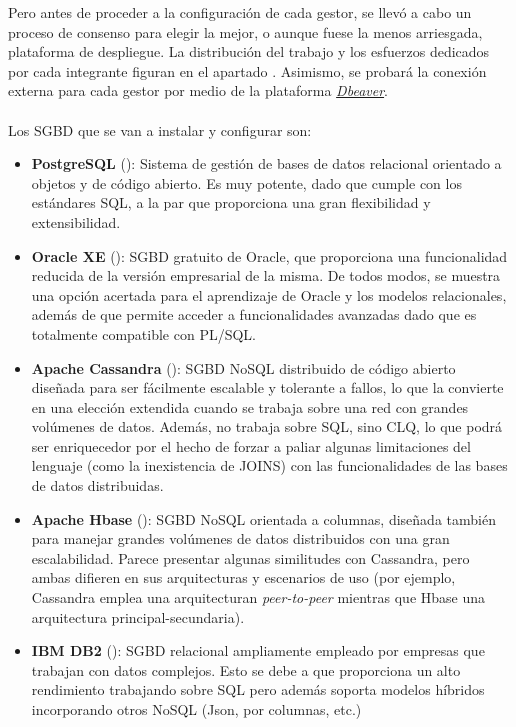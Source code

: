\documentclass{article}
\begin{document}
Pero antes de proceder a la configuración de cada gestor, se llevó a cabo un proceso de consenso para elegir la mejor, o aunque fuese la menos arriesgada, plataforma de despliegue. La distribución del trabajo y los esfuerzos dedicados por cada integrante figuran en el apartado \textcolor{blue}{}. Asimismo, se probará la conexión externa para cada gestor por medio de la plataforma \textit{\textcolor{blue}{\href{https://dbeaver.com/download/enterprise/}{Dbeaver}}}.
\\ \\
Los SGBD que se van a instalar y configurar son:
\begin{itemize}
    \item \textbf{PostgreSQL} (): Sistema de gestión de bases de datos relacional orientado a objetos y de código abierto. Es muy potente, dado que cumple con los estándares SQL, a la par que proporciona una gran flexibilidad y extensibilidad.
    \item \textbf{Oracle XE} (): SGBD gratuito de Oracle, que proporciona una funcionalidad reducida de la versión empresarial de la misma. De todos modos, se muestra una opción acertada para el aprendizaje de Oracle y los modelos relacionales, además de que permite acceder a funcionalidades avanzadas dado que es totalmente compatible con PL/SQL.
    \item \textbf{Apache Cassandra} (): SGBD NoSQL distribuido de código abierto diseñada para ser fácilmente escalable y tolerante a fallos, lo que la convierte en una elección extendida cuando se trabaja sobre una red con grandes volúmenes de datos. Además, no trabaja sobre SQL, sino CLQ, lo que podrá ser enriquecedor por el hecho de forzar a paliar algunas limitaciones del lenguaje (como la inexistencia de JOINS) con las funcionalidades de las bases de datos distribuidas.
    \item \textbf{Apache Hbase} (): SGBD NoSQL orientada a columnas, diseñada también para manejar grandes volúmenes de datos distribuidos con una gran escalabilidad. Parece presentar algunas similitudes con Cassandra, pero ambas difieren en sus arquitecturas y escenarios de uso (por ejemplo, Cassandra emplea una arquitecturan \textit{peer-to-peer} mientras que Hbase una arquitectura principal-secundaria).
    \item \textbf{IBM DB2} (): SGBD relacional ampliamente empleado por empresas que trabajan con datos complejos. Esto se debe a que proporciona un alto rendimiento trabajando sobre SQL pero además soporta modelos híbridos incorporando otros NoSQL (Json, por columnas, etc.)
\end{itemize}
\end{document}
